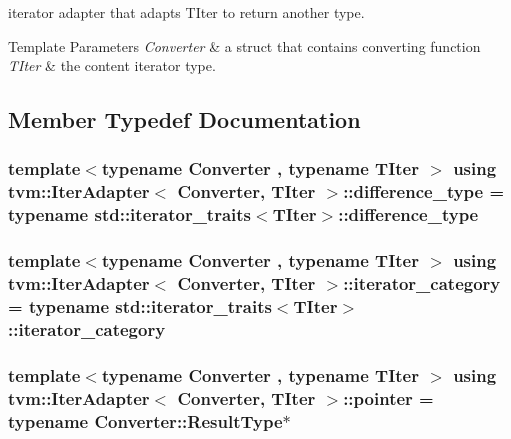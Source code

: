 iterator adapter that adapts T\+Iter to return another type. 


\begin{DoxyTemplParams}{Template Parameters}
{\em Converter} & a struct that contains converting function \\
\hline
{\em T\+Iter} & the content iterator type. \\
\hline
\end{DoxyTemplParams}


\subsection{Member Typedef Documentation}
\subsubsection[{\texorpdfstring{difference\+\_\+type}{difference_type}}]{\setlength{\rightskip}{0pt plus 5cm}template$<$typename Converter , typename T\+Iter $>$ using {\bf tvm\+::\+Iter\+Adapter}$<$ Converter, T\+Iter $>$\+::{\bf difference\+\_\+type} =  typename std\+::iterator\+\_\+traits$<$T\+Iter$>$\+::{\bf difference\+\_\+type}}\hypertarget{classtvm_1_1IterAdapter_a6fcccf32d94242ce3b0613db5bcd53d5}{}\label{classtvm_1_1IterAdapter_a6fcccf32d94242ce3b0613db5bcd53d5}
\subsubsection[{\texorpdfstring{iterator\+\_\+category}{iterator_category}}]{\setlength{\rightskip}{0pt plus 5cm}template$<$typename Converter , typename T\+Iter $>$ using {\bf tvm\+::\+Iter\+Adapter}$<$ Converter, T\+Iter $>$\+::{\bf iterator\+\_\+category} =  typename std\+::iterator\+\_\+traits$<$T\+Iter$>$\+::{\bf iterator\+\_\+category}}\hypertarget{classtvm_1_1IterAdapter_a2fa322bdb58941c57c6f25ea53678ed7}{}\label{classtvm_1_1IterAdapter_a2fa322bdb58941c57c6f25ea53678ed7}
\subsubsection[{\texorpdfstring{pointer}{pointer}}]{\setlength{\rightskip}{0pt plus 5cm}template$<$typename Converter , typename T\+Iter $>$ using {\bf tvm\+::\+Iter\+Adapter}$<$ Converter, T\+Iter $>$\+::{\bf pointer} =  typename Converter\+::\+Result\+Type$\ast$}\hypertarget{classtvm_1_1IterAdapter_acdd89c4869bbb96d00fafd85ff3a3492}{}\label{classtvm_1_1IterAdapter_acdd89c4869bbb96d00fafd85ff3a3492}
